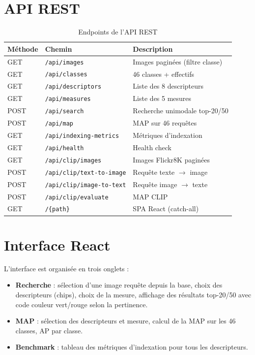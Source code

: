 \documentclass[12pt,a4paper]{report}
\begin{document}
\section{API REST}

\begin{table}[H]
  \centering\small
  \begin{tabular}{lll}
    \toprule
    Méthode & Chemin & Description \\
    \midrule
    GET  & \texttt{/api/images}              & Images paginées (filtre classe) \\
    GET  & \texttt{/api/classes}             & 46 classes + effectifs \\
    GET  & \texttt{/api/descriptors}         & Liste des 8 descripteurs \\
    GET  & \texttt{/api/measures}            & Liste des 5 mesures \\
    POST & \texttt{/api/search}              & Recherche unimodale top-20/50 \\
    POST & \texttt{/api/map}                 & MAP sur 46 requêtes \\
    GET  & \texttt{/api/indexing-metrics}    & Métriques d'indexation \\
    GET  & \texttt{/api/health}              & Health check \\
    GET  & \texttt{/api/clip/images}         & Images Flickr8K paginées \\
    POST & \texttt{/api/clip/text-to-image}  & Requête texte $\to$ image \\
    POST & \texttt{/api/clip/image-to-text}  & Requête image $\to$ texte \\
    POST & \texttt{/api/clip/evaluate}       & MAP CLIP \\
    GET  & \texttt{/\{path\}}                & SPA React (catch-all) \\
    \bottomrule
  \end{tabular}
  \caption{Endpoints de l'API REST}
\end{table}

\section{Interface React}

L'interface est organisée en trois onglets :
\begin{itemize}
  \item \textbf{Recherche} : sélection d'une image requête depuis la base, choix des descripteurs (chips), choix de la mesure, affichage des résultats top-20/50 avec code couleur vert/rouge selon la pertinence.
  \item \textbf{MAP} : sélection des descripteurs et mesure, calcul de la MAP sur les 46 classes, AP par classe.
  \item \textbf{Benchmark} : tableau des métriques d'indexation pour tous les descripteurs.
\end{itemize}
\end{document}
